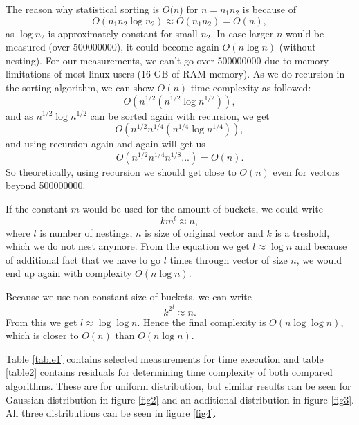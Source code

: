 \documentclass[12pt]{article}
\begin{document}
		The reason why statistical sorting is $O(n$) for $n = n_1 n_2$ is because of
		\[
		O(n_1 n_2 \log n_2) \approx O(n_1 n_2) = O(n),
		\]
		as $\log n_2$ is approximately constant for small $n_2$. In case larger $n$ would be measured (over 500000000), it could become again $O(n \log n)$ (without nesting). For our measurements, we can't go over 500000000 due to memory limitations of most linux users (16 GB of RAM memory). 
		As we do recursion in the sorting algorithm, we can show $O(n)$ time complexity as followed:
		\[
		O(n^{1/2} (n^{1/2} \log n^{1/2})),
		\]
		and as $n^{1/2} \log n^{1/2}$ can be sorted again with recursion, we get
		\[
		O(n^{1/2} n^{1/4} (n^{1/4} \log n^{1/4})),
		\]
		and using recursion again and again will get us
		\[
		O(n^{1/2} n^{1/4} n^{1/8} ...) = O(n).
		\]
		So theoretically, using recursion we should get close to $O(n)$ even for vectors beyond 500000000.
        
        If the constant $m$ would be used for the amount of buckets, we could write
        \[
        k m^l \approx n, 
        \]
        where $l$ is number of nestings, $n$ is size of original vector and $k$ is a treshold, which we do not nest anymore. From the equation we get $l \approx \log n$ and because of additional fact that we have to go $l$ times through vector of size $n$, we would end up again with complexity $O(n \log n)$.

        Because we use non-constant size of buckets, we can write
        \[
        {k^2}^l \approx n.
        \]
        From this we get $l \approx \log \log n$. Hence the final complexity is $O(n \log \log n)$, which is closer to $O(n)$ than $O(n \log n)$.
			
		Table \ref{table1} contains selected measurements for time execution and table \ref{table2} contains residuals for determining time complexity of both compared algorithms. These are for uniform distribution, but similar results can be seen for Gaussian distribution in figure \ref{fig2} and an additional distribution in figure \ref{fig3}. All three distributions can be seen in figure \ref{fig4}.
		
\end{document}
